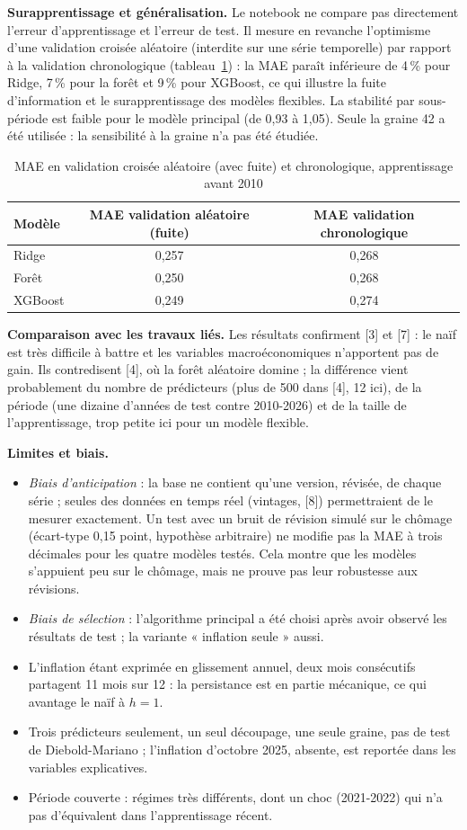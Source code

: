 \documentclass[11pt,a4paper]{article}
\begin{document}
\textbf{Surapprentissage et généralisation.} Le notebook ne compare pas directement l'erreur d'apprentissage et l'erreur de test. Il mesure en revanche l'optimisme d'une validation croisée aléatoire (interdite sur une série temporelle) par rapport à la validation chronologique (tableau~\ref{tab:fuite}) : la MAE paraît inférieure de 4\,\% pour Ridge, 7\,\% pour la forêt et 9\,\% pour XGBoost, ce qui illustre la fuite d'information et le surapprentissage des modèles flexibles. La stabilité par sous-période est faible pour le modèle principal (de 0,93 à 1,05). Seule la graine 42 a été utilisée : la sensibilité à la graine n'a pas été étudiée.
\begin{table}[H]\centering\small
\caption{MAE en validation croisée aléatoire (avec fuite) et chronologique, apprentissage avant 2010}\label{tab:fuite}
\begin{tabular}{@{}lcc@{}}
\toprule
Modèle & MAE validation aléatoire (fuite) & MAE validation chronologique\\\midrule
Ridge & 0,257 & 0,268\\
Forêt & 0,250 & 0,268\\
XGBoost & 0,249 & 0,274\\
\bottomrule
\end{tabular}
\end{table}

\textbf{Comparaison avec les travaux liés.} Les résultats confirment [3] et [7] : le naïf est très difficile à battre et les variables macroéconomiques n'apportent pas de gain. Ils contredisent [4], où la forêt aléatoire domine ; la différence vient probablement du nombre de prédicteurs (plus de 500 dans [4], 12 ici), de la période (une dizaine d'années de test contre 2010-2026) et de la taille de l'apprentissage, trop petite ici pour un modèle flexible.

\textbf{Limites et biais.}
\begin{itemize}
\item \emph{Biais d'anticipation} : la base ne contient qu'une version, révisée, de chaque série ; seules des données en temps réel (vintages, [8]) permettraient de le mesurer exactement. Un test avec un bruit de révision simulé sur le chômage (écart-type 0,15 point, hypothèse arbitraire) ne modifie pas la MAE à trois décimales pour les quatre modèles testés. Cela montre que les modèles s'appuient peu sur le chômage, mais ne prouve pas leur robustesse aux révisions.
\item \emph{Biais de sélection} : l'algorithme principal a été choisi après avoir observé les résultats de test ; la variante « inflation seule » aussi.
\item L'inflation étant exprimée en glissement annuel, deux mois consécutifs partagent 11 mois sur 12 : la persistance est en partie mécanique, ce qui avantage le naïf à $h=1$.
\item Trois prédicteurs seulement, un seul découpage, une seule graine, pas de test de Diebold-Mariano ; l'inflation d'octobre 2025, absente, est reportée dans les variables explicatives.
\item Période couverte : régimes très différents, dont un choc (2021-2022) qui n'a pas d'équivalent dans l'apprentissage récent.
\end{itemize}
\end{document}

